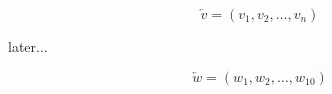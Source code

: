 \documentclass[10pt,a5paper]{article}
\newcommand{\myvecopt}[2][n]{({#2}_1,{#2}_2,\dots,{#2}_{#1})}
\providecommand{\vec}[1]{\overleftarrow{#1}}
\begin{document}
\[
	\vec{v}=\myvecopt{v} 
\]

later...

\[
	\vec{w}=\myvecopt[10]{w}
\]
\end{document}
